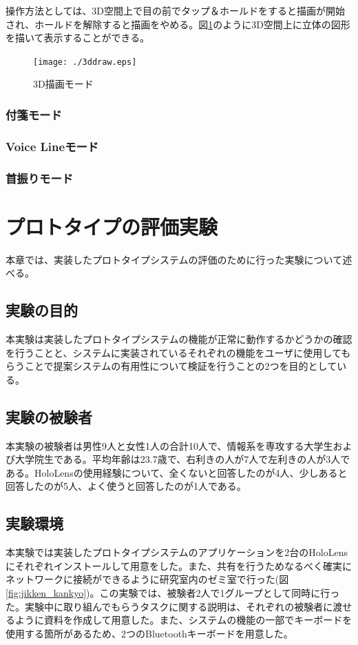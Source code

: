 \documentclass[11pt,a4j, titlepage]{jarticle} %
\begin{document}
操作方法としては、3D空間上で目の前でタップ＆ホールドをすると描画が開始され、ホールドを解除すると描画をやめる。図\ref{fig:3ddraw}のように3D空間上に立体の図形を描いて表示することができる。

\begin{figure}[H]
  \begin{center}
    \texttt{[image: ./3ddraw.eps]}
    \caption{3D描画モード}
    \label{fig:3ddraw}
  \end{center}
\end{figure}

\subsubsection{付箋モード}

\subsubsection{Voice Lineモード}

\subsubsection{首振りモード}


\newpage
\section{プロトタイプの評価実験}
本章では、実装したプロトタイプシステムの評価のために行った実験について述べる。

\subsection{実験の目的}
本実験は実装したプロトタイプシステムの機能が正常に動作するかどうかの確認を行うことと、システムに実装されているそれぞれの機能をユーザに使用してもらうことで提案システムの有用性について検証を行うことの2つを目的としている。

\subsection{実験の被験者}
本実験の被験者は男性9人と女性1人の合計10人で、情報系を専攻する大学生および大学院生である。平均年齢は23.7歳で、右利きの人が7人で左利きの人が3人である。HoloLensの使用経験について、全くないと回答したのが4人、少しあると回答したのが5人、よく使うと回答したのが1人である。

\subsection{実験環境}
本実験では実装したプロトタイプシステムのアプリケーションを2台のHoloLensにそれぞれインストールして用意をした。また、共有を行うためなるべく確実にネットワークに接続ができるように研究室内のゼミ室で行った(図\ref{fig:jikken_kankyo})。この実験では、被験者2人で1グループとして同時に行った。実験中に取り組んでもらうタスクに関する説明は、それぞれの被験者に渡せるように資料を作成して用意した。また、システムの機能の一部でキーボードを使用する箇所があるため、2つのBluetoothキーボードを用意した。
\end{document}
